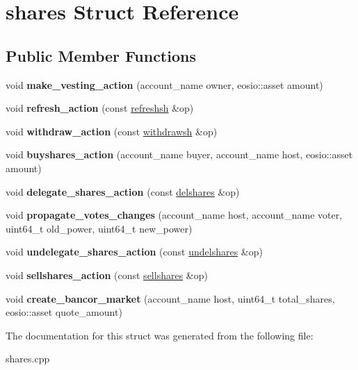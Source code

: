 \hypertarget{structshares}{}\section{shares Struct Reference}
\label{structshares}
\subsection*{Public Member Functions}
\begin{DoxyCompactItemize}
\item 
\mbox{\label{structshares_aaad39a5bf05a795da5f5721283b80d5e}} 
void {\bfseries make\+\_\+vesting\+\_\+action} (account\+\_\+name owner, eosio\+::asset amount)
\item 
\mbox{\label{structshares_aaefb29b55e8ac0cd52621b6696885da3}} 
void {\bfseries refresh\+\_\+action} (const \mbox{\hyperlink{structeosio_1_1refreshsh}{refreshsh}} \&op)
\item 
\mbox{\label{structshares_a87548a2a8ff7b86a02a945ceb30ac253}} 
void {\bfseries withdraw\+\_\+action} (const \mbox{\hyperlink{structeosio_1_1withdrawsh}{withdrawsh}} \&op)
\item 
\mbox{\label{structshares_acfdf7089d82b3a7ff80291d12d34167a}} 
void {\bfseries buyshares\+\_\+action} (account\+\_\+name buyer, account\+\_\+name host, eosio\+::asset amount)
\item 
\mbox{\label{structshares_ada05efc22c03bd229d42f0b579f40734}} 
void {\bfseries delegate\+\_\+shares\+\_\+action} (const \mbox{\hyperlink{structeosio_1_1delshares}{delshares}} \&op)
\item 
\mbox{\label{structshares_a6b80ca7e7bc7f64d7d394c8cf5634245}} 
void {\bfseries propagate\+\_\+votes\+\_\+changes} (account\+\_\+name host, account\+\_\+name voter, uint64\+\_\+t old\+\_\+power, uint64\+\_\+t new\+\_\+power)
\item 
\mbox{\label{structshares_a6a8653c210cd6948d9db804223e95456}} 
void {\bfseries undelegate\+\_\+shares\+\_\+action} (const \mbox{\hyperlink{structeosio_1_1undelshares}{undelshares}} \&op)
\item 
\mbox{\label{structshares_a70e191da9fad2ea9cb7dcf1e9cf956fd}} 
void {\bfseries sellshares\+\_\+action} (const \mbox{\hyperlink{structeosio_1_1sellshares}{sellshares}} \&op)
\item 
\mbox{\label{structshares_a2631ff23911070de3adce7589c56500f}} 
void {\bfseries create\+\_\+bancor\+\_\+market} (account\+\_\+name host, uint64\+\_\+t total\+\_\+shares, eosio\+::asset quote\+\_\+amount)
\end{DoxyCompactItemize}


The documentation for this struct was generated from the following file\+:\begin{DoxyCompactItemize}
\item 
shares.\+cpp\end{DoxyCompactItemize}
